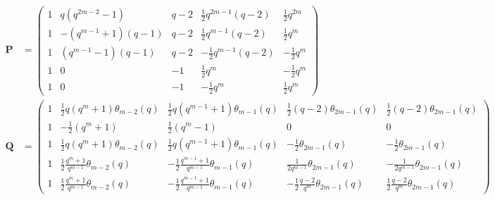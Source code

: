 \documentclass[a4paper]{article}
\theoremstyle{definition}
\newcommand{\comments}[1]{}
\begin{document}
\begin{align*}
 \mathbf P & = \begin{pmatrix}
  1 & q \left( q^{2m-2}-1 \right) & q-2 & \frac12 q^{2m-1}(q-2) & \frac 12 q^{2m} \\[0.5em]
  1 & -\left( q^{m-1} + 1 \right) (q-1) & q-2 & \frac12 q^{m-1}(q-2) & \frac12 q^m \\[0.5em]
  1 & \left( q^{m-1} - 1 \right) (q-1) & q-2 & -\frac12 q^{m-1}(q-2) & -\frac12 q^m \\[0.5em]
  1 & 0 & -1 & \frac12 q^m & -\frac12 q^m \\[0.5em]
  1 & 0 & -1 & -\frac12 q^m & \frac12 q^m
 \end{pmatrix} \\ \comments{
 \mathbf Q & = \begin{pmatrix}
  1 & \frac12 q \left( q^m + 1 \right) \frac{q^{m-1} - 1}{q-1} & \frac12 q \left( q^{m-1} + 1\right) \frac{q^m - 1}{q-1} & \frac 12 (q-2) \frac{q^{2m}-1}{q-1} & \frac 12 (q-2) \frac{q^{2m}-1}{q-1} \\[0.5em]
  1 & - \frac12 \left( q^m + 1 \right) & \frac12 \left( q^m - 1 \right) & 0 & 0 \\[0.5em]
  1 & \frac12 q \left( q^m + 1 \right) \frac{q^{m-1} - 1}{q-1} & \frac12 q \left(q^{m-1} + 1\right) \frac{q^m - 1}{q-1} & -\frac 12 \frac{q^{2m}-1}{q-1} & -\frac 12 \frac{q^{2m}-1}{q-1} \\[0.5em]
  1 & \frac 12 \frac{q^m + 1}{q^{m-1}} \frac{q^{m-1}-1}{q-1} & -\frac 12 \frac{q^{m-1}+1}{q^{m-1}} \frac{q^m - 1}{q-1} & \frac 1 {2q^{m-1}} \frac{q^{2m-1}-1}{q-1} & -\frac{1}{2q^{m-1}} \frac{q^{2m-1}-1}{q-1} \\[0.5em]
  1 & \frac12 \frac{q^m + 1}{q^{m-1}} \frac{q^{m-1} - 1}{q-1} & -\frac12 \frac{q^{m-1} + 1}{q^{m-1}} \frac{q^m - 1}{q-1} & -\frac 12 \frac{q-2}{q^m} \frac{q^{2m}-1}{q-1} & \frac{q-2}{2q^m} \frac{q^{2m}-1}{q-1}
 \end{pmatrix}
 \\ }
 \mathbf Q & =\begin{pmatrix}
  1 & \frac12 q \left( q^m + 1 \right) \theta_{m-2}(q) & \frac12 q \left( q^{m-1} + 1\right) \theta_{m-1}(q) & \frac 12 (q-2) \theta_{2m-1}(q) & \frac 12 (q-2) \theta_{2m-1}(q) \\[0.5em]
  1 & - \frac12 \left( q^m + 1 \right) & \frac12 \left( q^m - 1 \right) & 0 & 0 \\[0.5em]
  1 & \frac12 q \left( q^m + 1 \right) \theta_{m-2}(q) & \frac12 q \left(q^{m-1} + 1\right) \theta_{m-1}(q) & -\frac 12 \theta_{2m-1}(q) & -\frac 12 \theta_{2m-1}(q) \\[0.5em]
  1 & \frac 12 \frac{q^m + 1}{q^{m-1}} \theta_{m-2}(q) & -\frac 12 \frac{q^{m-1}+1}{q^{m-1}} \theta_{m-1}(q) & \frac 1 {2q^{m-1}} \theta_{2m-1}(q) & -\frac{1}{2q^{m-1}} \theta_{2m-1}(q) \\[0.5em]
  1 & \frac12 \frac{q^m + 1}{q^{m-1}} \theta_{m-2}(q) & -\frac12 \frac{q^{m-1} + 1}{q^{m-1}} \theta_{m-1}(q) & -\frac 12 \frac{q-2}{q^m} \theta_{2m-1}(q) & \frac12\frac{q-2}{q^m} \theta_{2m-1}(q)
 \end{pmatrix}
\end{align*}
\end{document}
